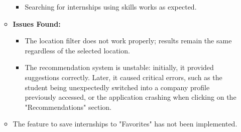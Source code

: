 \begin{itemize}
\begin{itemize}
\begin{itemize}
            \item Searching for internships using skills works as expected.
        \end{itemize}
        \item \textbf{Issues Found:}
        \begin{itemize}
            \item The location filter does not work properly; results remain the same regardless of the selected location.
            \item The recommendation system is unstable: initially, it provided suggestions correctly.
                Later, it caused critical errors, such as the student being unexpectedly switched into a company profile
                previously accessed, or the application crashing when clicking on the "Recommendations" section.
        \end{itemize}
        \item The feature to save internships to "Favorites" has not been implemented.
    \end{itemize}

\end{itemize}

